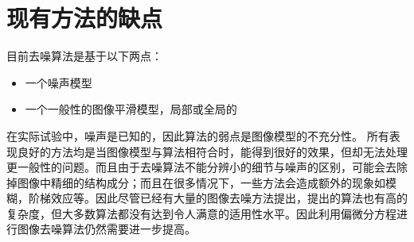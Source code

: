 \documentclass[a4paper,12pt]{article}
\begin{document}
\section{现有方法的缺点}
目前去噪算法是基于以下两点：
\begin{itemize}
\item 一个噪声模型
\item 一个一般性的图像平滑模型，局部或全局的
\end{itemize}
在实际试验中，噪声是已知的，因此算法的弱点是图像模型的不充分性。
所有表现良好的方法均是当图像模型与算法相符合时，能得到很好的效果，但却无法处理更一般性的问题。而且由于去噪算法不能分辨小的细节与噪声的区别，可能会去除掉图像中精细的结构成分；而且在很多情况下，一些方法会造成额外的现象如模糊，阶梯效应等。因此尽管已经有大量的图像去噪方法提出，提出的算法也有高的复杂度，但大多数算法都没有达到令人满意的适用性水平。因此利用偏微分方程进行图像去噪算法仍然需要进一步提高。



\end{document}
